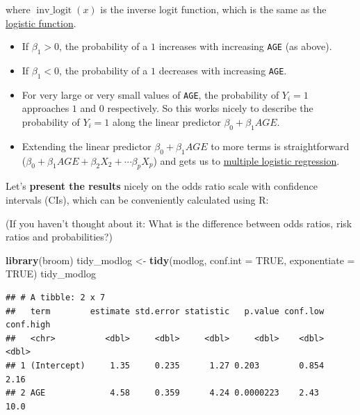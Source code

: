 \documentclass[
]{book}
\newenvironment{Shaded}{\begin{snugshade}}{\end{snugshade}}
\newcommand{\AttributeTok}[1]{\textcolor[rgb]{0.13,0.29,0.53}{#1}}
\newcommand{\ConstantTok}[1]{\textcolor[rgb]{0.56,0.35,0.01}{#1}}
\newcommand{\FunctionTok}[1]{\textcolor[rgb]{0.13,0.29,0.53}{\textbf{#1}}}
\newcommand{\NormalTok}[1]{#1}
\newcommand{\OtherTok}[1]{\textcolor[rgb]{0.56,0.35,0.01}{#1}}
\providecommand{\tightlist}{%
  \setlength{\itemsep}{0pt}\setlength{\parskip}{0pt}}
\begin{document}
where \(\operatorname{inv\_logit}(x)\) is the inverse logit function, which is the same
as the \href{https://en.wikipedia.org/wiki/Logistic_function}{logistic function}.

\begin{itemize}
\tightlist
\item
  If \(\beta_1 > 0\), the probability of a \(1\) increases with increasing \texttt{AGE} (as above).
\item
  If \(\beta_1 < 0\), the probability of a \(1\) decreases with increasing \texttt{AGE}.
\item
  For very large or very small values of \texttt{AGE}, the probability of
  \(Y_i = 1\) approaches \(1\) and \(0\) respectively. So this works nicely to describe
  the probability of \(Y_i = 1\) along the linear predictor \(\beta_0 + \beta_1 AGE\).
\item
  Extending the linear predictor \(\beta_0 + \beta_1 AGE\) to more terms is
  straightforward (\(\beta_0 + \beta_1 AGE + \beta_2 X_2 + \cdots \beta_p X_p\)) and gets
  us to \hyperref[multiple_logistic_regression]{multiple logistic regression}.
\end{itemize}

Let's \textbf{present the results} nicely on the odds ratio scale with
confidence intervals (CIs), which can be conveniently calculated using R:

(If you haven't thought about it:
What is the difference between odds ratios, risk ratios and probabilities?)

\begin{Shaded}
\begin{Highlighting}[]
\FunctionTok{library}\NormalTok{(broom)}
\NormalTok{tidy\_modlog }\OtherTok{\textless{}{-}} \FunctionTok{tidy}\NormalTok{(modlog, }\AttributeTok{conf.int =} \ConstantTok{TRUE}\NormalTok{, }\AttributeTok{exponentiate =} \ConstantTok{TRUE}\NormalTok{)}
\NormalTok{tidy\_modlog}
\end{Highlighting}
\end{Shaded}

\begin{verbatim}
## # A tibble: 2 x 7
##   term        estimate std.error statistic   p.value conf.low conf.high
##   <chr>          <dbl>     <dbl>     <dbl>     <dbl>    <dbl>     <dbl>
## 1 (Intercept)     1.35     0.235      1.27 0.203        0.854      2.16
## 2 AGE             4.58     0.359      4.24 0.0000223    2.43      10.0
\end{verbatim}
\end{document}
